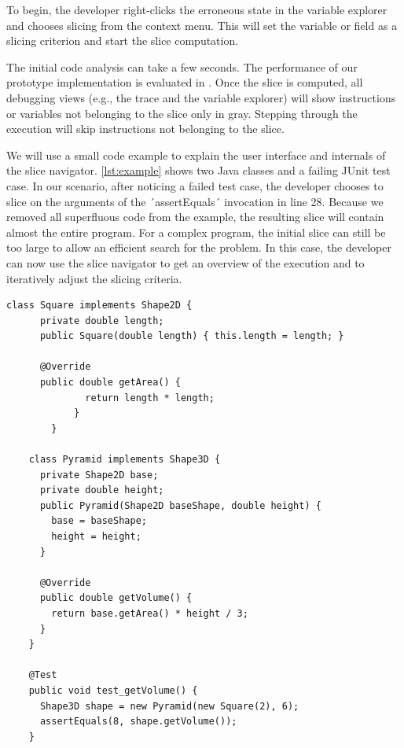﻿\documentclass[
      english,
      ]{llncs}
\begin{document}

To begin, the developer right-clicks the erroneous state in the variable explorer and chooses slicing from the context menu.
This will set the variable or field as a slicing criterion and start the slice computation.

The initial code analysis can take a few seconds.
The performance of our prototype implementation is evaluated in  .
Once the slice is computed, all debugging views (e.g., the trace and the variable explorer) will show instructions or variables not belonging to the slice only in gray.
Stepping through the execution will skip instructions not belonging to the slice.

We will use a small code example to explain the user interface and internals of the slice navigator. 
\autoref{lst:example} shows two Java classes and a failing JUnit test case.
In our scenario, after noticing a failed test case, the developer chooses to slice on the arguments of the ´assertEquals´ invocation in line 28.
Because we removed all superfluous code from the example, the resulting slice will contain almost the entire program.
For a complex program, the initial slice can still be too large to allow an efficient search for the problem.
In this case, the developer can now use the slice navigator to get an overview of the execution and to iteratively adjust the slicing criteria.

\begin{lstlisting}[numberfirstline=true,firstnumber=1,label=lst:example,caption={Example program with a failing test case}]
  	class Square implements Shape2D {
  	  private double length;
  	  public Square(double length) { this.length = length; }
  	  
  	  @Override
  	  public double getArea() { 
			  return length * length; 
			}
		}
  	
  	class Pyramid implements Shape3D {
  	  private Shape2D base;
  	  private double height;
  	  public Pyramid(Shape2D baseShape, double height) {
  	    base = baseShape;
  	    height = height;
  	  }
  	  
  	  @Override
  	  public double getVolume() { 
  	    return base.getArea() * height / 3; 
  	  }
  	}
  	
    @Test
    public void test_getVolume() {
      Shape3D shape = new Pyramid(new Square(2), 6);
      assertEquals(8, shape.getVolume());
    }
\end{lstlisting}
\end{document}
